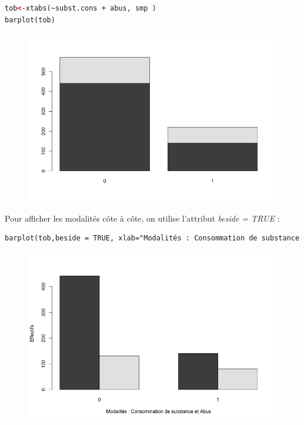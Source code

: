 \begin{lstlisting}[language=html]
tob<-xtabs(~subst.cons + abus, smp )
barplot(tob)
\end{lstlisting}
\begin{figure}[H]\begin{center}\includegraphics[scale=0.5]{ilu/ch.png}\end{center}\end{figure}
Pour afficher les modalités côte à côte, on utilise l'attribut \textit{beside = TRUE} :
\begin{lstlisting}[language=html]
barplot(tob,beside = TRUE, xlab="Modalités : Consommation de substance et Abus", ylab = "Effectifs")
\end{lstlisting}
\begin{figure}[H]\begin{center}\includegraphics[scale=0.5]{ilu/ci.png}\end{center}\end{figure}
